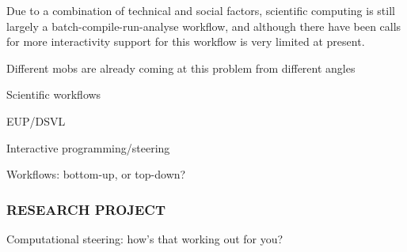 \documentclass[a4paper]{scrartcl}
\begin{document}
Due to a combination of technical and social factors, scientific
computing is still largely a batch-compile-run-analyse workflow, and
although there have been calls for more
interactivity\parencite{Gil2007} support for this workflow is very
limited at present\parencite{Mattoso}.

Different mobs are already coming at this problem from different angles

Scientific workflows

EUP/DSVL

Interactive programming/steering

Workflows: bottom-up, or top-down?




\subsubsection*{RESEARCH PROJECT}

Computational steering: how's that working out for you?






\end{document}
